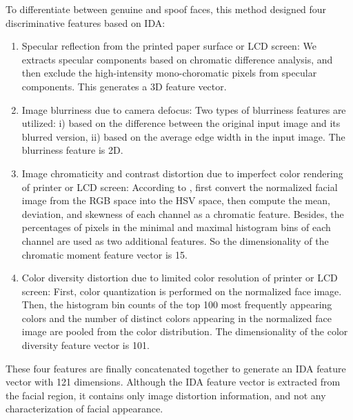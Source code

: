 \documentclass[journal]{IEEEtran}
\begin{document}
To differentiate between genuine and spoof faces, this method designed four discriminative features based on IDA:
\begin{enumerate}
\item Specular reflection from the printed paper surface or LCD screen: We extracts specular components based on chromatic difference analysis\cite{tan2008separating}, and then exclude the high-intensity mono-choromatic pixels from specular components\cite{gao2010single}. This generates a 3D feature vector.
\item Image blurriness due to camera defocus: Two types of blurriness features are utilized: i) based on the difference between the original input image and its blurred version\cite{crete2007blur}, ii) based on the average edge width in the input image\cite{marziliano2002no}. The blurriness feature is 2D.
\item Image chromaticity and contrast distortion due to imperfect color rendering of printer or LCD screen: According to \cite{chen2006automatic}, first convert the normalized facial image from the RGB space into the HSV space, then compute the mean, deviation, and skewness of each channel as a chromatic feature. Besides, the percentages of pixels in the minimal and maximal histogram bins of each channel are used as two additional features. So the dimensionality of the chromatic moment feature vector is 15.
\item Color diversity distortion due to limited color resolution of printer or LCD screen: First, color quantization is performed on the normalized face image\cite{chen2006automatic}. Then, the histogram bin counts of the top 100 most frequently appearing colors and the number of distinct colors appearing in the normalized face image are pooled from the color distribution. The dimensionality of the color diversity feature vector is 101.
\end{enumerate}

These four features are finally concatenated together to generate an IDA feature vector with 121 dimensions. Although the IDA feature vector is extracted from the facial region, it contains only image distortion information, and not any characterization of facial appearance.
\end{document}
